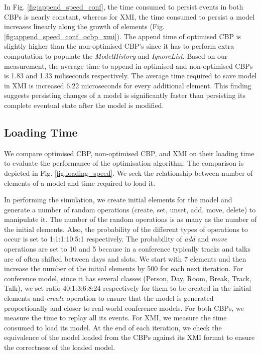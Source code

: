 \documentclass{llncs}
\begin{document}
In Fig. \ref{fig:append_speed_conf}, the time consumed to persist events in both CBPs is nearly constant, whereas for XMI, the time consumed to persist a model increases linearly along the growth of elements (Fig. \ref{fig:append_speed_conf_ocbp_xmi}). The append time of optimised CBP is slightly higher than the non-optimised CBP's since it has to perform extra computation to populate the \emph{ModelHistory} and \emph{IgnoreList}. Based on our measurement, the average time to append in optimised and non-optimised CBPs is 1.83 and 1.33 miliseconds respectively. The average time required to save model in XMI is increased 6.22 microseconds for every additional element. This finding suggests persisting changes of a model is significantly faster than persisting its complete eventual state after the model is modified.    

\subsection{Loading Time}
\label{subsec:loading_time_test}
We compare optimised CBP, non-optimised CBP, and XMI on their loading time to evaluate the performance of the optimisation algorithm. The  comparison is depicted in Fig. \ref{fig:loading_speed}. We seek the relationship between number of elements of a model and time required to load it. 

In performing the simulation, we create initial elements for the model and generate a number of random operations (create, set, unset, add, move, delete) to manipulate it. The number of the random operations is as many as the number of the initial elements. Also, the probability of the different types of operations to occur is set to 1:1:1:10:5:1 respectively. The probability of \emph{add} and \emph{move} operations are set to 10 and 5 because in a conference typically tracks and talks are of often shifted between days and slots. We start with 7 elements and then increase the number of the initial elements by 500 for each next iteration. For conference model, since it has several classes (Person, Day, Room, Break, Track, Talk), we set ratio 40:1:3:6:8:24 respectively for them to be created in the initial elements and \emph{create} operation to ensure that the model is generated proportionally and closer to real-world conference models. For both CBPs, we measure the time to replay all its events. For XMI, we measure the time consumed to load its model. At the end of each iteration, we check the equivalence of the model loaded from the CBPs against its XMI format to ensure the correctness of the loaded model.
\end{document}
